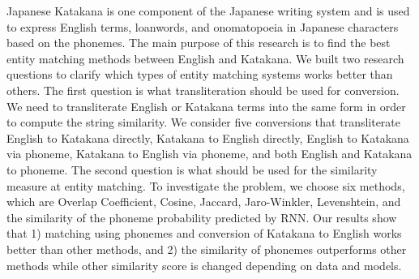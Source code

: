 Japanese Katakana is one component of the Japanese writing system and is used to express English terms, loanwords, and onomatopoeia in Japanese characters based on the phonemes. The main purpose of this research is to find the best entity matching methods between English and Katakana. We built two research questions to clarify which types of entity matching systems works better than others. The first question is what transliteration should be used for conversion. We need to transliterate English or Katakana terms into the same form in order to compute the string similarity. We consider five conversions that transliterate English to Katakana directly, Katakana to English directly, English to Katakana via phoneme, Katakana to English via phoneme, and both English and Katakana to phoneme. The second question is what should be used for the similarity measure at entity matching. To investigate the problem, we choose six methods, which are Overlap Coefficient, Cosine, Jaccard, Jaro-Winkler, Levenshtein, and the similarity of the phoneme probability predicted by RNN. Our results show that 1) matching using phonemes and conversion of Katakana to English works better than other methods, and 2) the similarity of phonemes outperforms other methods while other similarity score is changed depending on data and models.
